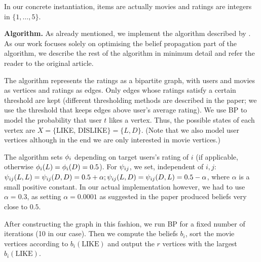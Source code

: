 \documentclass[letterpaper]{article}
\newcommand{\mypar}[1]{{\bf #1.}}
\begin{document}
In our concrete instantiation, items are actually movies and ratings are
integers in $\{1, \ldots, 5\}$.

\mypar{Algorithm} As already mentioned, we implement the algorithm described by
\citet{top-n-recommendation}. As our work focuses solely on optimising the
belief propagation part of the algorithm, we describe the rest of the algorithm
in minimum detail and refer the reader to the original article.

The algorithm represents the ratings as a bipartite graph, with users and
movies as vertices and ratings as edges. Only edges whose ratings satisfy a
certain threshold are kept (different thresholding methods are described in the
paper; we use the threshold that keeps edges above user's average rating). We use BP to model the probability that user $t$ likes a vertex. Thus,
the possible states of each vertex are $X = \{$LIKE, DISLIKE$\} =
\{L, D\}$. (Note that we also model user vertices although in the end we are
only interested in movie vertices.)

The algorithm sets $\phi_i$ depending on target users's rating of $i$ (if applicable, otherwise $\phi_i(L) = \phi_i(D) = 0.5$). For $\psi_{ij}$, we set, independent of $i, j$:
$\psi_{ij}(L, L) = \psi_{ij}(D, D) = 0.5 + \alpha; \psi_{ij}(L,
D) = \psi_{ij}(D, L) = 0.5 - \alpha$, where
$\alpha$ is a small positive constant. In our actual implementation however, we had to use $\alpha = 0.3$, as setting $\alpha = 0.0001$ as suggested in the paper produced beliefs very close to $0.5$.

After constructing the graph in this fashion, we run BP for a fixed number of
iterations (10 in our case). Then we compute the beliefs $b_i$, sort the movie
vertices according to $b_i(\text{LIKE})$ and output the $r$ vertices with the
largest $b_i(\text{LIKE})$.
\end{document}
